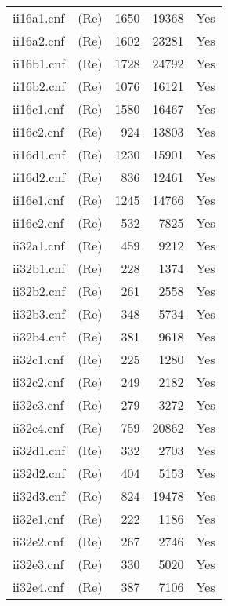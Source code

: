
\tablelasttail{\hline}
\begin{supertabular}{|lc|rr|c|}
ii16a1.cnf&(Re)&1650 &19368 &Yes\\
ii16a2.cnf&(Re)&1602 &23281 &Yes\\
ii16b1.cnf&(Re)&1728 &24792 &Yes\\
ii16b2.cnf&(Re)&1076 &16121 &Yes\\
ii16c1.cnf&(Re)&1580 &16467 &Yes\\
ii16c2.cnf&(Re)&924 &13803 &Yes\\
ii16d1.cnf&(Re)&1230 &15901 &Yes\\
ii16d2.cnf&(Re)&836 &12461 &Yes\\
ii16e1.cnf&(Re)&1245 &14766 &Yes\\
ii16e2.cnf&(Re)&532 &7825 &Yes\\
ii32a1.cnf&(Re)&459 &9212 &Yes\\
ii32b1.cnf&(Re)&228 &1374 &Yes\\
ii32b2.cnf&(Re)&261 &2558 &Yes\\
ii32b3.cnf&(Re)&348 &5734 &Yes\\
ii32b4.cnf&(Re)&381 &9618 &Yes\\
ii32c1.cnf&(Re)&225 &1280 &Yes\\
ii32c2.cnf&(Re)&249 &2182 &Yes\\
ii32c3.cnf&(Re)&279 &3272 &Yes\\
ii32c4.cnf&(Re)&759 &20862 &Yes\\
ii32d1.cnf&(Re)&332 &2703 &Yes\\
ii32d2.cnf&(Re)&404 &5153 &Yes\\
ii32d3.cnf&(Re)&824 &19478 &Yes\\
ii32e1.cnf&(Re)&222 &1186 &Yes\\
ii32e2.cnf&(Re)&267 &2746 &Yes\\
ii32e3.cnf&(Re)&330 &5020 &Yes\\
ii32e4.cnf&(Re)&387 &7106 &Yes\\

\end{supertabular}
